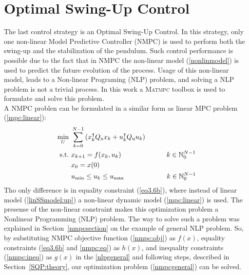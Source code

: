 \section{Optimal Swing-Up Control}
The last control strategy is an Optimal Swing-Up Control. In this strategy, only one non-linear Model Predictive Controller (NMPC) is used to perform both the swing-up and the stabilization of the pendulum. Such control performance is possible due to the fact that in NMPC the non-linear model (\ref{nonlinmodel}) is used to predict the future evolution of the process.  Usage of this non-linear model, leads to a Non-linear Programing (NLP) problem, and solving a NLP problem is not a trivial process. In this work a \textsc{Matmpc} toolbox is used \cite{MATMPC} to formulate and solve this problem.\\

A NMPC problen can be formulated in a similar form as linear MPC problem (\ref{mpc:linear}):
\begin{subequations}\label{nmpcgeneral}
	\begin{align}
	\min_{U}\ &\sum_{k=0}^{N-1} \left(  x_{k}^\intercal Q _{\text{x}}x_{k}+u_{k}^\intercal Q _{\text{u}}u_{k} \right)\label{nmpc:obj}\\
\text{s.t.}\ &x_{k+1} = f(x_{k}, u_{k})\qquad\qquad\qquad \ \   k \in \mathbb{N}_0^{N-1}\label{eq3.6b}\\
&x_0 = x(0)\label{nmpc:eq}\\
&u _{\text{min}}\leq u_{k}\leq u _{\text{max}}\qquad\qquad\qquad\;   k \in \mathbb{N}_0^{N-1}\label{nmpc:ineq}
	\end{align}
\end{subequations}
Tho only difference is in equality constraint (\ref{eq3.6b}), where instead of linear model (\ref{linSSmodel:up}) a non-linear dynamic model (\ref{mpc:linear}) is used. The presense of the non-linear constraint makes this optimization problem a Nonlinear Programming (NLP) problem. The way to solve such a problem was explained in Section~\ref{nmpcsection} on the example of general NLP problem. So, by substituting NMPC objective function (\ref{nmpc:obj}) as $f(x)$, equality constraints (\ref{eq3.6b} and \ref{nmpc:eq}) as $h(x)$, and inequality constraints (\ref{nmpc:ineq}) as $g(x)$ in the \ref{nlpgeneral} and following steps, described in Section~\ref{SQP:theory}, our optimization problem (\ref{nmpcgeneral}) can be solved.\\

